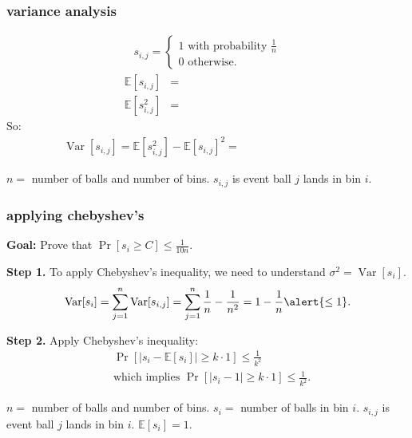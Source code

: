 \documentclass[compress]{beamer}
\newcommand{\E}{\mathbb{E}}
\DeclareMathOperator{\Var}{Var}
\begin{document}
\begin{frame}
	\frametitle{variance analysis}

	\begin{align*}
		s_{i,j} = \begin{cases}
			1 \text{ with probability } \frac{1}{n}\\
			0 \text{ otherwise}.
		\end{cases}
	\end{align*}
	\begin{align*}
		\E[s_{i,j}] &= \hspace{10em}\\
		\E[s_{i,j}^2] &=  \hspace{10em}
	\end{align*}
	So:
	\begin{align*}
		\Var[s_{i,j}] = \E[s_{i,j}^2] - \E[s_{i,j}]^2 =  \hspace{10em}
	\end{align*}
	
	\vspace{0em}
	\begin{block}{\vspace*{-3ex}}
		\small $n = $ number of balls and number of bins. $s_{i,j}$ is event ball $j$ lands in bin $i$.
	\end{block}
\end{frame}

\begin{frame}
	\frametitle{applying chebyshev's}
	\textbf{Goal:} Prove that $\Pr[s_i \geq C] \leq \frac{1}{10n}$. 
	
	\textbf{Step 1.} To apply Chebyshev's inequality, we need to understand $\sigma^2 = \Var[s_i]$. 
	\begin{align*}
		\Var[s_i] = \sum_{j=1}^n \Var[s_{i,j}] = \sum_{j=1}^n \frac{1}{n} - \frac{1}{n^2} = {1- \frac{1}{n} \alert{\leq 1}.}
	\end{align*}
	
	\textbf{Step 2.} Apply Chebyshev's inequality:
	\begin{align*}
		&\Pr\left[\left|s_i - \E[s_i]\right| \geq k\cdot 1\right] \leq \frac{1}{k^2} \\
		&\text{which implies }\Pr\left[\left|s_i - 1\right| \geq k\cdot 1\right] \leq \frac{1}{k^2}.
	\end{align*}
	
	\vspace{0em}
	\begin{block}{\vspace*{-3ex}}
		\small $n = $ number of balls and number of bins. $s_i=$ number of balls in bin $i$.  $s_{i,j}$ is event ball $j$ lands in bin $i$. $\E[s_i] = 1$. 
	\end{block}
\end{frame}
\end{document}
